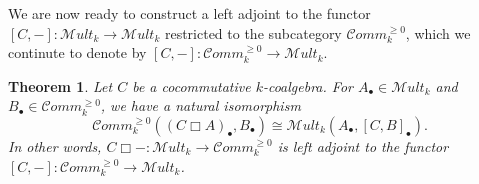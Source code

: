 \documentclass[10pt, colorlinks]{article}
\numberwithin{equation}{section} \DeclareMathSizes{2}{10}{12}{13}
\newtheorem{Thm}[thm]{Theorem}
\begin{document}
    
    We are now ready to construct a left adjoint to the functor $[C,-]:\mathscr{M}ult_k\longrightarrow \mathscr Mult_k$ restricted to the subcategory  $\mathcal Comm_k^{\geq 0}$, which we continute to denote by $[C,-] : \mathcal Comm_k^{\geq 0} \longrightarrow \mathscr{M}ult_k$.

    \smallskip
    \begin{Thm}\label{Thm3.9}
        Let $C$ be a cocommutative $k$-coalgebra. For  $A_\bullet\in \mathscr Mult_k$ and  $B_\bullet\in \mathcal Comm^{\geq 0}_k$, we have a natural isomorphism 
        \begin{equation}\label{3.23nk}
            \mathcal Comm_k^{\geq 0}\left((C\Box A)_\bullet,B_\bullet\right)\cong {\mathscr Mult_k}\left(A_\bullet, [C,B]_\bullet\right).
     \end{equation} In other words, $C\Box-:\mathscr Mult_k\longrightarrow \mathcal Comm_k^{\geq 0}$ is  left adjoint to the functor $ [C,-] : \mathcal Comm_k^{\geq 0} \longrightarrow \mathscr{M}ult_k$.
    \end{Thm}
\end{document}
